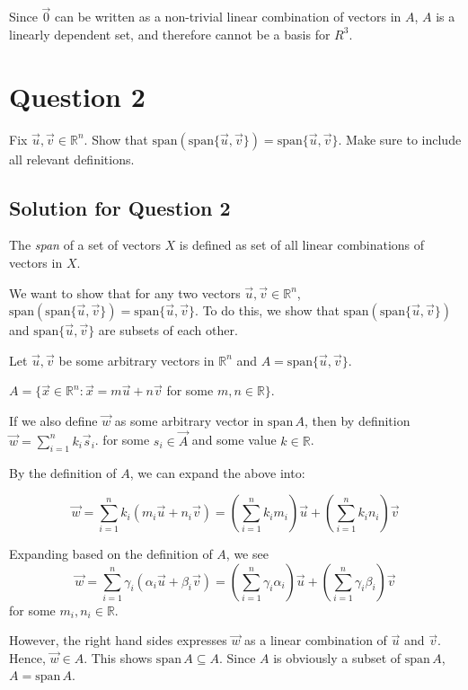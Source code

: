\documentclass[letter]{article}
\newcommand{\R}{\mathbb{R}}
\newcommand{\Span}{\mathrm{span}}
\begin{document}
Since $\vec 0$ can be written as a non-trivial linear combination of vectors in $A$, $A$ is a linearly dependent set, and therefore cannot be a basis for $R^3$.

\section{Question 2}

Fix $\vec u,\vec v\in \R^n$.  Show that $\Span(\Span\{\vec u,\vec v\})=\Span\{\vec u,\vec v\}$.
      Make sure to include all relevant definitions.

\subsection{Solution for Question 2}

    The \emph{span} of a set of vectors $X$ is defined as set of all linear combinations of vectors in $X$.

    We want to show that for any two vectors $\vec u,\vec v\in \R^n$,
        $\Span(\Span\{\vec u,\vec v\})=\Span\{\vec u,\vec v\}$. To do this, we show that $\Span(\Span\{\vec u,\vec v\})$ and $\Span\{\vec u,\vec v\}$ are subsets of each other.

  Let $\vec u,\vec v$ be some arbitrary vectors in $\R^n$ and $A=\Span\{\vec u,\vec v\}$.

  $A=\{\vec x\in\R^n:\vec x=m\vec u+n\vec v$ for some $m,n\in \R\}$.

    If we also define $\vec w$ as some arbitrary vector in $\Span\,A$, then by definition
    $\vec w=\sum_{i=1}^n k_i\vec s_i$. for some $s_i \in \vec A$ and some value $k \in \R$.

By the definition of $A$, we can expand the above into:

\[
    \vec w =\sum_{i=1}^n k_i (m_i\vec u+n_i\vec v)=
          (\sum_{i=1}^n k_i m_i)\vec u+
          (\sum_{i=1}^n k_i n_i)\vec v
\]

 Expanding based on the definition
        of $A$, we see
        \[
          \vec w =\sum_{i=1}^n \gamma_i (\alpha_i\vec u+\beta_i\vec v)=
          \left(\sum_{i=1}^n \gamma_i \alpha_i\right)\vec u+
          \left(\sum_{i=1}^n \gamma_i \beta_i\right)\vec v
        \]
        for some $m_i,n_i\in \R$.

        However, the right hand sides expresses
        $\vec w$ as a linear combination of $\vec u$ and $\vec v$.  Hence, $\vec w\in A$.
        This shows $\Span\, A\subseteq A$.  Since $A$ is obviously a subset of  $\Span\,A$, $A=\Span\,A$.
\end{document}
